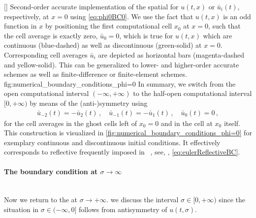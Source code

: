 	[]%
	{%
		Second-order accurate \fv{} implementation of the spatial \bc{} for $u ( t, x)$ or $\bar{u}_i (t)$, respectively, at $x = 0$ using \cref{eq:phi0BC0}. 
		We use the fact that $u ( t, x )$ is an odd function in $x$ by positioning the first computational cell $x_0$ at $x = 0$, such that the cell average is exactly zero, $\bar{u}_0 = 0$, which is true for $u (t, x)$ which are continuous (blue-dashed) as well as discontinuous (green-solid) at $x = 0$.
		Corresponding cell averages $\bar{u}_i$ are depicted as horizontal bars (magenta-dashed and yellow-solid).
		This \bc{} can be generalized to lower- and higher-order accurate \fv{} schemes as well as finite-difference or finite-element schemes.
	}%
	{fig:numerical_boundary_conditions_phi=0}%
In summary, we switch from the open computational interval $ ( - \infty, + \infty ) $ to the half-open computational interval $ [ 0, + \infty ) $ by means of the \ZII{} (anti-)symmetry using
\begin{align}
	\bar{u}_{-2} ( t ) = - \bar{u}_{2} ( t )\,,\quad \bar{u}_{- 1} ( t ) = - \bar{u}_{1} ( t )\,,\quad \bar{u}_0 ( t ) = 0\,,
	\label{eq:phi0BC0}
\end{align}
for the cell averages in the ghost cells left of $x_0 = 0$ and in the cell at $x_0$ itself.
This construction is visualized in \cref{fig:numerical_boundary_conditions_phi=0} for exemplary continuous and discontinuous initial conditions. 
It effectively corresponds to reflective \bcs{} frequently imposed in \cfd{}~\cite{LeVeque:1992,LeVeque:2002,SpringelLectureNotes}, see, \eg{}, \cref{eq:eulerReflectiveBC}.

\paragraph{The boundary condition at $\sigma \rightarrow \infty$}\label{paragraph:BCinf}\mbox{}\\
Now we return to the \bc{} at $\sigma \rightarrow + \infty$.
\WlogA{} we discuss the interval ${\sigma \in [ 0, + \infty )}$ since the situation in $\sigma \in (- \infty,0]$ follows from \ZII{} antisymmetry of $u(t,\sigma)$.

